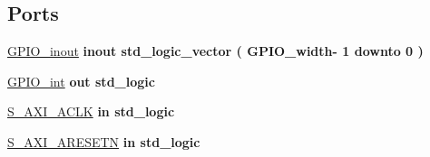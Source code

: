 \subsection*{Ports}
 \begin{DoxyCompactItemize}
\item 
\hypertarget{classmy_g_p_i_o___a_x_i_ga8829699d739ef35a4c5da396ffd38387}{\hyperlink{group__my_g_p_i_o_ga8829699d739ef35a4c5da396ffd38387}{G\+P\+I\+O\+\_\+inout}  {\bfseries {\bfseries \textcolor{vhdlchar}{inout}\textcolor{vhdlchar}{ }}} {\bfseries \textcolor{vhdlchar}{std\+\_\+logic\+\_\+vector}\textcolor{vhdlchar}{ }\textcolor{vhdlchar}{(}\textcolor{vhdlchar}{ }\textcolor{vhdlchar}{ }\textcolor{vhdlchar}{ }\textcolor{vhdlchar}{ }\textcolor{vhdlchar}{G\+P\+I\+O\+\_\+width}\textcolor{vhdlchar}{-\/}\textcolor{vhdlchar}{ } \textcolor{vhdldigit}{1} \textcolor{vhdlchar}{ }\textcolor{vhdlchar}{downto}\textcolor{vhdlchar}{ }\textcolor{vhdlchar}{ } \textcolor{vhdldigit}{0} \textcolor{vhdlchar}{ }\textcolor{vhdlchar}{)}\textcolor{vhdlchar}{ }} }\label{classmy_g_p_i_o___a_x_i_ga8829699d739ef35a4c5da396ffd38387}

\item 
\hypertarget{classmy_g_p_i_o___a_x_i_gaa6c2451f4f1ffd390697f0b66453c2c8}{\hyperlink{group__my_g_p_i_o_gaa6c2451f4f1ffd390697f0b66453c2c8}{G\+P\+I\+O\+\_\+int}  {\bfseries {\bfseries \textcolor{vhdlchar}{out}\textcolor{vhdlchar}{ }}} {\bfseries \textcolor{vhdlchar}{std\+\_\+logic}\textcolor{vhdlchar}{ }} }\label{classmy_g_p_i_o___a_x_i_gaa6c2451f4f1ffd390697f0b66453c2c8}

\item 
\hypertarget{classmy_g_p_i_o___a_x_i_ga3f54d782a88290bdaa6baffd7cd84ab4}{\hyperlink{group__my_g_p_i_o_ga3f54d782a88290bdaa6baffd7cd84ab4}{S\+\_\+\+A\+X\+I\+\_\+\+A\+C\+L\+K}  {\bfseries {\bfseries \textcolor{vhdlchar}{in}\textcolor{vhdlchar}{ }}} {\bfseries \textcolor{vhdlchar}{std\+\_\+logic}\textcolor{vhdlchar}{ }} }\label{classmy_g_p_i_o___a_x_i_ga3f54d782a88290bdaa6baffd7cd84ab4}

\item 
\hypertarget{classmy_g_p_i_o___a_x_i_ga089b396e17dee353ccc7d5389dda5532}{\hyperlink{group__my_g_p_i_o_ga089b396e17dee353ccc7d5389dda5532}{S\+\_\+\+A\+X\+I\+\_\+\+A\+R\+E\+S\+E\+T\+N}  {\bfseries {\bfseries \textcolor{vhdlchar}{in}\textcolor{vhdlchar}{ }}} {\bfseries \textcolor{vhdlchar}{std\+\_\+logic}\textcolor{vhdlchar}{ }} }\label{classmy_g_p_i_o___a_x_i_ga089b396e17dee353ccc7d5389dda5532}


\end{DoxyCompactItemize}
